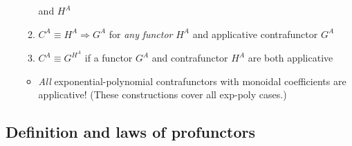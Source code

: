 \begin{itemize}
\begin{enumerate}
and $H^{A}$
\item $C^{A}\equiv H^{A}\Rightarrow G^{A}$ for \emph{any} \emph{functor}
$H^{A}$ and applicative contrafunctor $G^{A}$
\item $C^{A}\equiv G^{H^{A}}$ if a functor $G^{A}$ and contrafunctor $H^{A}$
are both applicative
\end{enumerate}
\begin{itemize}
\item \emph{All} exponential-polynomial contrafunctors with monoidal coefficients
are applicative! (These constructions cover all exp-poly cases.)
\end{itemize}
\end{itemize}


\subsection{Definition and laws of profunctors}
